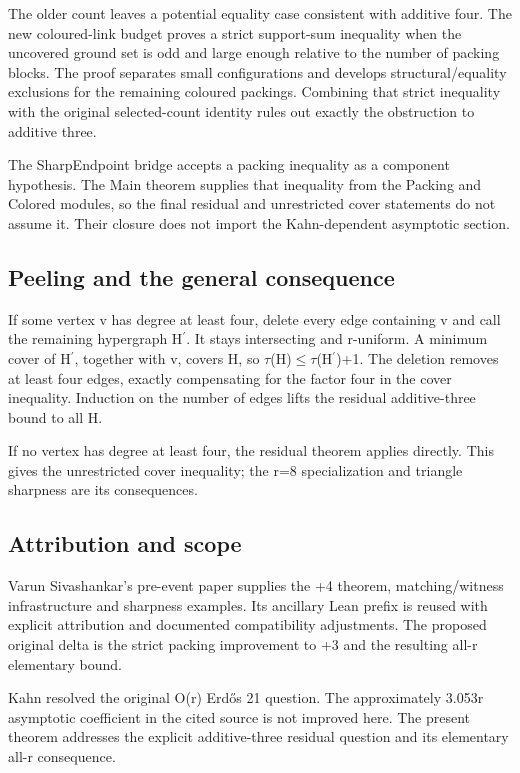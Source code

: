 \documentclass[11pt,a4paper]{article}
\begin{document}
The older count leaves a potential equality case consistent with additive four. The new coloured-link budget proves a strict support-sum inequality when the uncovered ground set is odd and large enough relative to the number of packing blocks. The proof separates small configurations and develops structural/equality exclusions for the remaining coloured packings. Combining that strict inequality with the original selected-count identity rules out exactly the obstruction to additive three.

The SharpEndpoint bridge accepts a packing inequality as a component hypothesis. The Main theorem supplies that inequality from the Packing and Colored modules, so the final residual and unrestricted cover statements do not assume it. Their closure does not import the Kahn-dependent asymptotic section.

\subsection{Peeling and the general consequence}
If some vertex v has degree at least four, delete every edge containing v and call the remaining hypergraph H\ensuremath{^{\prime}}. It stays intersecting and r-uniform. A minimum cover of H\ensuremath{^{\prime}}, together with v, covers H, so \ensuremath{\tau}(H)\ensuremath{\leq}\ensuremath{\tau}(H\ensuremath{^{\prime}})+1. The deletion removes at least four edges, exactly compensating for the factor four in the cover inequality. Induction on the number of edges lifts the residual additive-three bound to all H.

If no vertex has degree at least four, the residual theorem applies directly. This gives the unrestricted cover inequality; the r=8 specialization and triangle sharpness are its consequences.

\subsection{Attribution and scope}
Varun Sivashankar's pre-event paper supplies the +4 theorem, matching/witness infrastructure and sharpness examples. Its ancillary Lean prefix is reused with explicit attribution and documented compatibility adjustments. The proposed original delta is the strict packing improvement to +3 and the resulting all-r elementary bound.

Kahn resolved the original O(r) Erdős 21 question. The approximately 3.053r asymptotic coefficient in the cited source is not improved here. The present theorem addresses the explicit additive-three residual question and its elementary all-r consequence.
\end{document}
